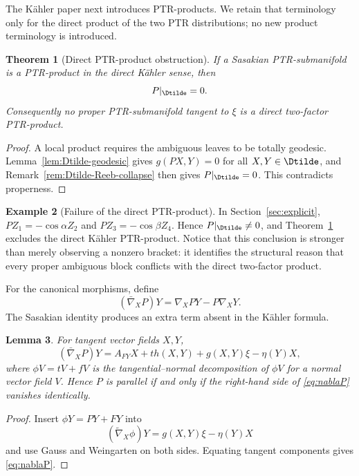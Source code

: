\documentclass[11pt]{article}
\newtheorem{theorem}{Theorem}[section]\newtheorem{proposition}[theorem]{Proposition}
\newtheorem{lemma}[theorem]{Lemma}\newtheorem{corollary}[theorem]{Corollary}
\theoremstyle{definition}\newtheorem{definition}[theorem]{Definition}\newtheorem{example}[theorem]{Example}
\theoremstyle{remark}\newtheorem{remark}[theorem]{Remark}
\begin{document}
The K\"ahler paper next introduces PTR-products.  We retain that terminology only for the direct product of the two PTR distributions; no new product terminology is introduced.

\begin{theorem}[Direct PTR-product obstruction]\label{thm:ptrproduct-shape}
If a Sasakian PTR-submanifold is a PTR-product in the direct K\"ahler
sense, then
\[
P|_{\Dtilde}=0.
\]
Consequently no proper PTR-submanifold tangent to \(\xi\) is a direct
two-factor PTR-product.
\end{theorem}
\begin{proof}
A local product requires the ambiguous leaves to be totally geodesic.
Lemma~\ref{lem:Dtilde-geodesic} gives \(g(PX,Y)=0\) for all
\(X,Y\in\Dtilde\), and Remark~\ref{rem:Dtilde-Reeb-collapse} then gives
\(P|_{\Dtilde}=0\).  This contradicts properness.
\end{proof}

\begin{example}[Failure of the direct PTR-product]\label{ex:ptrproduct-shape}
In Section~\ref{sec:explicit}, $PZ_1=-\cos\alpha Z_2$ and $PZ_3=-\cos\beta Z_4$.  Hence $P|_{\Dtilde}\neq0$, and Theorem~\ref{thm:ptrproduct-shape} excludes the direct K\"ahler PTR-product.  Notice that this conclusion is stronger than merely observing a nonzero bracket: it identifies the structural reason that every proper ambiguous block conflicts with the direct two-factor product.
\end{example}

For the canonical morphisms, define
\[
 (\bar\nabla_XP)Y=\nabla_XPY-P\nabla_XY.
\]
The Sasakian identity produces an extra term absent in the K\"ahler formula.

\begin{lemma}\label{lem:parallelP}
For tangent vector fields $X,Y$,
\begin{equation}\label{eq:nablaP}
 (\bar\nabla_XP)Y=A_{FY}X+t h(X,Y)+g(X,Y)\xi-\eta(Y)X,
\end{equation}
where $\phi V=tV+fV$ is the tangential--normal decomposition of $\phi V$ for a normal vector field $V$.  Hence $P$ is parallel if and only if the right-hand side of \eqref{eq:nablaP} vanishes identically.
\end{lemma}
\begin{proof}
Insert $\phi Y=PY+FY$ into
\[
 (\widetilde\nabla_X\phi)Y=g(X,Y)\xi-\eta(Y)X
\]
and use Gauss and Weingarten on both sides.  Equating tangent components gives \eqref{eq:nablaP}.
\end{proof}
\end{document}
